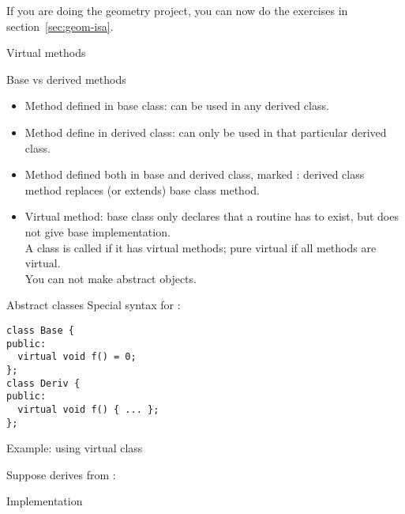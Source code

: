 \begin{exercise}
  If you are doing the geometry project, 
  you can now do the exercises in section~\ref{sec:geom-isa}.
\end{exercise}

 {Virtual methods}

\begin{block}{Base vs derived methods}
  \begin{itemize}
  \item Method defined in base class: can be used in any derived class.
  \item Method define in derived class: can only be used in that
    particular derived class.
  \item Method defined both in base and derived class, marked
    : derived class method replaces (or extends)
    base class method.
  \item Virtual method: base class only declares that a routine has to
    exist, but does not give base implementation.\\ A class is called
     if it has virtual methods; pure
    virtual if all methods are virtual.\\ You can not make abstract objects.
  \end{itemize}  
\end{block}

\begin{block}{Abstract classes}
  Special syntax for :
\begin{lstlisting}
class Base {
public:
  virtual void f() = 0;
};
class Deriv {
public:
  virtual void f() { ... };
};
\end{lstlisting}
\end{block}

\begin{block}{Example: using virtual class}
  \small
  \begin{multicols}{2}
    \vfill\columnbreak
    Suppose  derives from :\\
  \end{multicols}
\end{block}

\begin{block}{Implementation}
  \footnotesize
  \begin{multicols}{2}
    \vfill\columnbreak
  \end{multicols}
\end{block}

